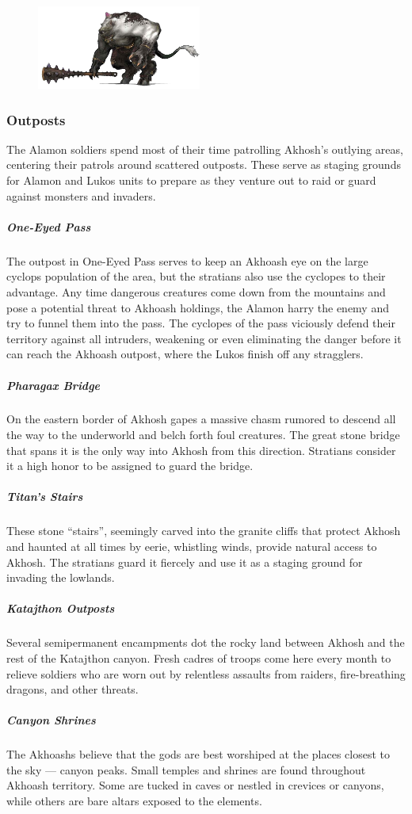     \begin{figure}[!t] %
        \centering
        \includegraphics[width=0.48\textwidth]{02viphoger/img/10cyclops}
    \end{figure}

    \subsubsection{Outposts}
        The Alamon soldiers spend most of their time patrolling Akhosh's outlying areas, centering their patrols around scattered outposts.
        These serve as staging grounds for Alamon and Lukos units to prepare as they venture out to raid or guard against monsters and invaders.

        \subparagraph{One-Eyed Pass} The outpost in One-Eyed Pass serves to keep an Akhoash eye on the large cyclops population of the area, but the stratians also use the cyclopes to their advantage.
        Any time dangerous creatures come down from the mountains and pose a potential threat to Akhoash holdings, the Alamon harry the enemy and try to funnel them into the pass.
        The cyclopes of the pass viciously defend their territory against all intruders, weakening or even eliminating the danger before it can reach the Akhoash outpost, where the Lukos finish off any stragglers.

        \subparagraph{Pharagax Bridge} On the eastern border of Akhosh gapes a massive chasm rumored to descend all the way to the underworld and belch forth foul creatures.
        The great stone bridge that spans it is the only way into Akhosh from this direction.
        Stratians consider it a high honor to be assigned to guard the bridge.

        \subparagraph{Titan's Stairs} These stone ``stairs'', seemingly carved into the granite cliffs that protect Akhosh and haunted at all times by eerie, whistling winds, provide natural access to Akhosh.
        The stratians guard it fiercely and use it as a staging ground for invading the lowlands.

        \subparagraph{Katajthon Outposts} Several semipermanent encampments dot the rocky land between Akhosh and the rest of the Katajthon canyon.
        Fresh cadres of troops come here every month to relieve soldiers who are worn out by relentless assaults from raiders, fire-breathing dragons, and other threats.

        \subparagraph{Canyon Shrines} The Akhoashs believe that the gods are best worshiped at the places closest to the sky --- canyon peaks.
        Small temples and shrines are found throughout Akhoash territory.
        Some are tucked in caves or nestled in crevices or canyons, while others are bare altars exposed to the elements.

\pagebreak
